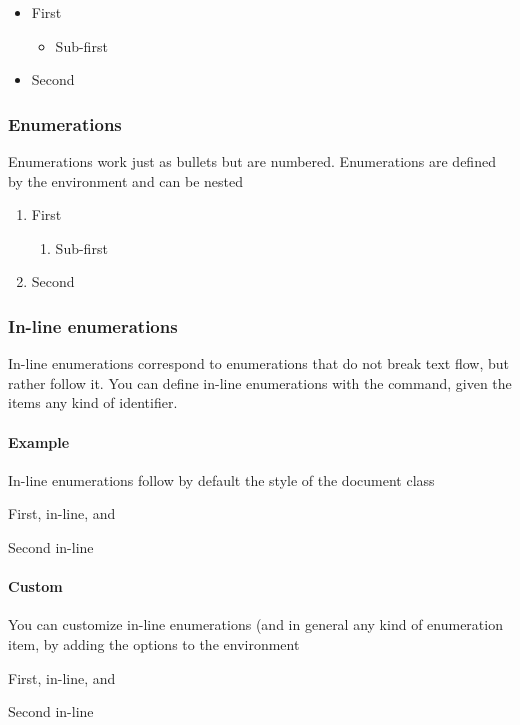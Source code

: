 \begin{itemize}
\item First
\begin{itemize}
\item Sub-first
\end{itemize}
\item Second
\end{itemize}


\subsubsection{Enumerations}

Enumerations work just as bullets but are numbered. Enumerations are defined by the  environment and can be nested

\begin{enumerate}
\item First
\begin{enumerate}
\item Sub-first
\end{enumerate}
\item Second
\end{enumerate}

\subsubsection{In-line enumerations}

In-line enumerations correspond to enumerations that do not break text flow, but rather follow it.
You can define in-line enumerations with the  command, given the items any kind of identifier.

\paragraph{Example} 
In-line enumerations follow by default the style of the document class
\begin{enumerate*}
\item First, in-line, and 
\item Second in-line
\end{enumerate*}

\paragraph{Custom} 
You can customize in-line enumerations (and in general any kind of enumeration item, by adding the options to the environment
\begin{enumerate*}[label=(\arabic*)]
\item First, in-line, and 
\item Second in-line
\end{enumerate*}


